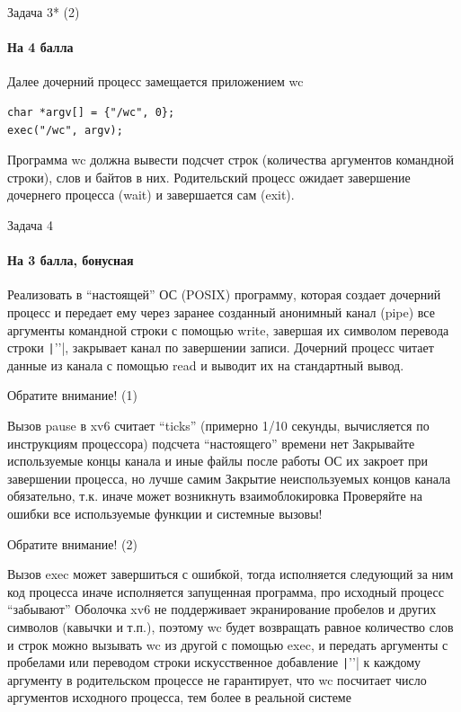 \documentclass{../../slides-style}
\begin{document}
        \begin{frame}[fragile]{Задача 3* (2)}
        \framesubtitle{На 4 балла}
        Далее дочерний процесс замещается приложением wc

        \begin{verbatim}
char *argv[] = {"/wc", 0};
exec("/wc", argv);
        \end{verbatim}

        Программа wc должна вывести подсчет строк (количества аргументов командной строки), слов и байтов в них. Родительский процесс ожидает завершение дочернего процесса (wait) и завершается сам (exit).
    \end{frame}

    \begin{frame}{Задача 4}
        \framesubtitle{На 3 балла, бонусная}
        Реализовать в \enquote{настоящей} ОС (POSIX) программу, которая создает дочерний процесс и передает ему через заранее созданный анонимный канал (pipe) все аргументы командной строки с помощью write, завершая их символом перевода строки \texttt|'\n'|, закрывает канал по завершении записи. Дочерний процесс читает данные из канала с помощью read и выводит их на стандартный вывод.
    \end{frame}

    \begin{frame}{Обратите внимание! (1)}
        \begin{outline}
            \1 Вызов pause в xv6 считает \enquote{ticks} (примерно 1/10 секунды, вычисляется по инструкциям процессора)
                \2 подсчета \enquote{настоящего} времени нет
            \1 Закрывайте используемые концы канала и иные файлы после работы
                \2 ОС их закроет при завершении процесса, но лучше самим
            \1 Закрытие неиспользуемых концов канала обязательно, т.к. иначе может возникнуть взаимоблокировка
            \1 Проверяйте на ошибки все используемые функции и системные вызовы!
        \end{outline}
    \end{frame}

    \begin{frame}{Обратите внимание! (2)}
        \begin{outline}
            \1 Вызов exec может завершиться с ошибкой, тогда исполняется следующий за ним код процесса
                \2 иначе исполняется запущенная программа, про исходный процесс \enquote{забывают}
            \1 Оболочка xv6 не поддерживает экранирование пробелов и других символов (кавычки и т.п.), поэтому wc будет возвращать равное количество слов и строк
                \2 можно вызывать wc из другой с помощью exec, и передать аргументы с пробелами или переводом строки
                \2 искусственное добавление \texttt|'\n'| к каждому аргументу в родительском процессе не гарантирует, что wc посчитает число аргументов исходного процесса, тем более в реальной системе
        \end{outline}
    \end{frame}
\end{document}
